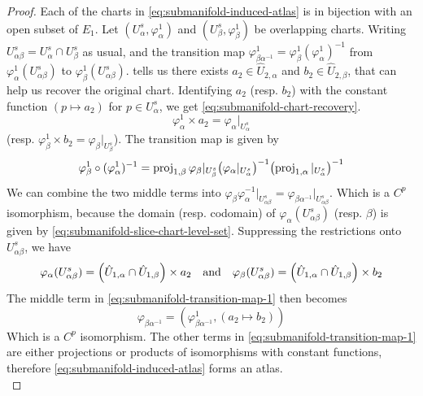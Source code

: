 \documentclass[../main-v2-manifolds.tex]{subfiles}
\begin{document}
\begin{proof}
    Each of the charts in \cref{eq:submanifold-induced-atlas} is in bijection with an open subset of $E_1$. Let $(U^s_{\alpha}, \varphi^1_\alpha)$ and $(U^s_{\beta}, \varphi^1_\beta)$ be overlapping charts. Writing $U^s_{\alpha\beta} = U^s_{\alpha}\cap U^s_{\beta}$ as usual, and the transition map $\varphi^1_{\beta\alpha^{-1}} = \varphi^1_{\beta}(\varphi^1_{\alpha})^{-1}$ from $\varphi_{\alpha}^1(U_{\alpha\beta}^s)$ to $\varphi_{\beta}^1(U_{\alpha\beta}^s)$.  tells us there exists $a_2\in \hat{U}_{2,\alpha}$ and $b_2\in \hat{U}_{2,\beta}$, that can help us recover the original chart. Identifying $a_2$ (resp. $b_2$) with the constant function $(p\mapsto a_2)$ for $p\in U_{\alpha}^s$, we get \cref{eq:submanifold-chart-recovery}.
    \begin{equation}\label{eq:submanifold-chart-recovery}
    \varphi^1_{\alpha}\times a_2 = \varphi_{\alpha}\vert_{U^s_{\alpha}}
    \end{equation}
    (resp. $\varphi^1_{\beta}\times b_2 = \varphi_{\beta}\vert_{U^s_{\beta}}$). The transition map is given by
    \begin{equation}\label{eq:submanifold-transition-map-1}
    \varphi^1_{\beta}\circ (\varphi^1_{\alpha})^{-1} = \operatorname{proj}_{1,\beta}\varphi_{\beta}\vert_{U^s_{\beta}}\qty(\varphi_{\alpha}\vert_{U^s_{\alpha}})^{-1}\qty(\operatorname{proj}_{1,\alpha}\vert_{U^s_{\alpha}})^{-1}    
    \end{equation}
    We can combine the two middle terms into $\varphi_{\beta}\varphi_{\alpha}^{-1}\vert_{U^s_{\alpha\beta}}=\varphi_{\beta\alpha^{-1}}\vert_{U^s_{\alpha\beta}}$. Which is a $C^p$ isomorphism, because the domain (resp. codomain) of $\varphi_{\alpha}(U^s_{\alpha\beta})$ (resp. $\beta$) is given by \cref{eq:submanifold-slice-chart-level-set}. Suppressing the restrictions onto $U^s_{\alpha\beta}$, we have
    \[
        \varphi_{\alpha}(U^s_{\alpha\beta}) = \qty(\hat{U}_{1,\alpha}\cap\hat{U}_{1,\beta})\times a_2 \qqtext{and}\varphi_{\beta}(U^s_{\alpha\beta}) = \qty(\hat{U}_{1,\alpha}\cap\hat{U}_{1,\beta})\times b_2
    \]
    The middle term in \cref{eq:submanifold-transition-map-1} then becomes
    \[
        \varphi_{\beta\alpha^{-1}} = (\varphi^{1}_{\beta\alpha^{-1}}, (a_2\mapsto b_2))
    \]
    Which is a $C^p$ isomorphism. The other terms in \cref{eq:submanifold-transition-map-1} are either projections or products of isomorphisms with constant functions, therefore \cref{eq:submanifold-induced-atlas} forms an atlas.\\


\end{proof}
\end{document}
